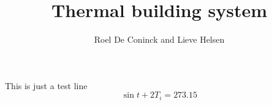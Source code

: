
\title{Thermal building system}
\author{Roel De Coninck and Lieve Helsen}

\maketitle


This is just a test line
\begin{equation}
\sin{t} + 2 T_i = 273.15
\end{equation}

%









